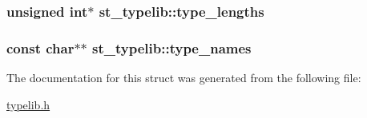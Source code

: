 \subsubsection[{type\+\_\+lengths}]{\setlength{\rightskip}{0pt plus 5cm}unsigned int$\ast$ st\+\_\+typelib\+::type\+\_\+lengths}\label{structst__typelib_ae5755c42d2adb8746990c5dc6f1fca56}
\hypertarget{structst__typelib_a34213db673ed358a00b1f11d86c477f7}{}
\subsubsection[{type\+\_\+names}]{\setlength{\rightskip}{0pt plus 5cm}const char$\ast$$\ast$ st\+\_\+typelib\+::type\+\_\+names}\label{structst__typelib_a34213db673ed358a00b1f11d86c477f7}


The documentation for this struct was generated from the following file\+:\begin{DoxyCompactItemize}
\item 
\hyperlink{typelib_8h}{typelib.\+h}\end{DoxyCompactItemize}
